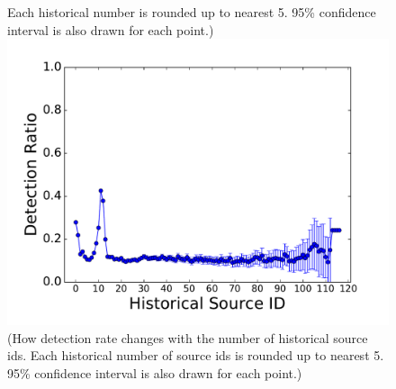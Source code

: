 \begin{figure}[!htb]
{{Each historical number is rounded up to nearest 5.
95\% confidence interval is also drawn for each point.)}}
\endminipage\hfill
{}%
  \includegraphics[width=\linewidth]{figure/SubID}
{\footnotesize{(How detection rate changes with the number of historical source ids. 
Each historical number of source ids is rounded up to nearest 5.
95\% confidence interval is also drawn for each point.)}}
\endminipage\hfill

\end{figure}
